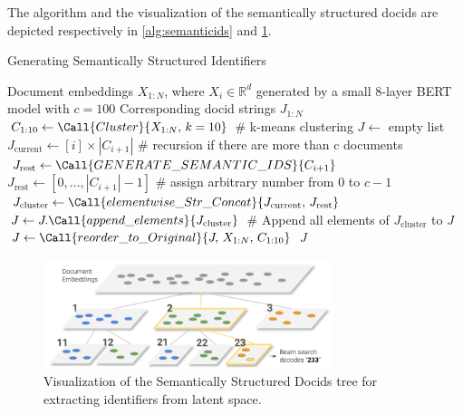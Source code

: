 The algorithm and the visualization of the semantically structured docids are depicted respectively in \ref{alg:semanticids} and \ref{fig:ssdocids-visualization}.


\begin{algorithm}[H]
    \label{alg:semanticids}
    \caption{Generating Semantically Structured Identifiers}
    \begin{algorithmic}[1]
    \Require Document embeddings $X_{1:N}$, where $X_i \in \mathbb{R}^d$ generated by a small 8-layer BERT model with $c=100$
    \Ensure Corresponding docid strings $J_{1:N}$
        \State $C_{1:10} \gets \Call{Cluster}{X_{1:N},\, k=10}$ \# k-means clustering
        \State $J \gets$ empty list
            \State $J_{\text{current}} \gets [i] \times |C_{i+1}|$
             \# recursion if there are more than c documents
                \State $J_{\text{rest}} \gets \Call{GENERATE\_SEMANTIC\_IDS}{C_{i+1}}$
            \Else
                \State $J_{\text{rest}} \gets [0,\dots,|C_{i+1}| - 1]$ \# assign arbitrary number from 0 to $c-1$
            \EndIf
            \State $J_{\text{cluster}} \gets \Call{elementwise\_Str\_Concat}{J_{\text{current}},\,J_{\text{rest}}}$
            \State $J \gets J.\Call{append\_elements}{J_{\text{cluster}}}$ \# Append all elements of $J_{\text{cluster}}$ to $J$
        \EndFor
        \State $J \gets \Call{reorder\_to\_Original}{J,\,X_{1:N},\,C_{1:10}}$
        \State \Return $J$
    \EndFunction
    \end{algorithmic}
\end{algorithm}


\begin{figure}
    \centering
    \includegraphics[width=0.75\textwidth]{../figs/ssdocid.png}
    \caption{Visualization of the Semantically Structured Docids tree for extracting identifiers from latent space.}
    \label{fig:ssdocids-visualization}
  \end{figure}

